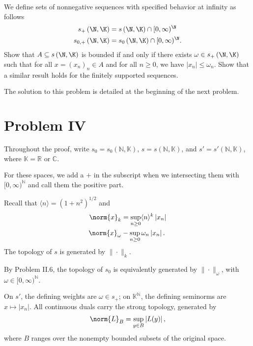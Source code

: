 \documentclass[10pt]{mypackage}
\begin{document}
\begin{problem}
  We define sets of nonnegative sequences with specified behavior at infinity as follows
  \begin{align*}
    s_{+}\left( \N,\K \right) &= s\left( \N,\K \right)\cap [0,\infty)^{\N}\\
    s_{0,+}\left( \N,\K \right) &= s_{0}\left( \N,\K \right)\cap [0,\infty)^{\N}.
  \end{align*}
  Show that $A\subseteq s\left( \N,\K \right)$ is bounded if and only if there exists $\omega\in s_{+}\left( \N,\K \right)$ such that for all $x = \left( x_n \right)_n\in A$ and for all $n\geq 0$, we have $\left\vert x_n \right\vert\leq \omega_n$. Show that a similar result holds for the finitely supported sequences.
\end{problem}
\begin{solution}
  The solution to this problem is detailed at the beginning of the next problem.
\end{solution}
\section{Problem IV}%
Throughout the proof, write \(s_0=s_0(\mathbb{N},\mathbb{K})\), \(s=s(\mathbb{N},\mathbb{K})\), and \(s'=s'(\mathbb{N},\mathbb{K})\), where \(\mathbb{K}=\mathbb{R}\) or \(\mathbb{C}\).

For these spaces, we add a $+$ in the subscript when we intersecting them with \([0,\infty)^{\mathbb{N}}\) and call them the positive part.

Recall that \(\langle n\rangle=(1+n^2)^{1/2}\) and
\begin{align*}
  \norm{x}_k &=\sup_{n\geq 0}\langle n\rangle^k\left\vert x_n \right\vert\\
  \norm{x}_{\omega} &- \sup_{n\geq 0} \omega_n \left\vert x_n \right\vert.
\end{align*}
The topology of \(s\) is generated by \(\|\cdot\|_k\).

By Problem II.6, the topology of \(s_0\) is equivalently generated by \(\|\cdot\|_\omega\), with \(\omega\in[0,\infty)^{\mathbb{N}}\).

On \(s'\), the defining weights are \(\omega\in s_+\); on \(\mathbb{K}^{\mathbb{N}}\), the defining seminorms are \(x\mapsto\left\vert x_n \right\vert\). All continuous duals carry the strong topology, generated by
\begin{align*}
  \norm{L}_B=\sup_{y\in B}\left\vert L(y) \right\vert,
\end{align*}
where \(B\) ranges over the nonempty bounded subsets of the original space.
\end{document}
